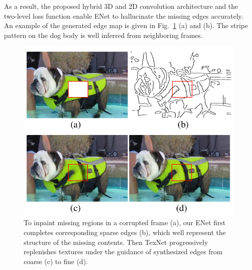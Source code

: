As a result, the proposed hybrid 3D and 2D convolution architecture and the two-level loss function enable ENet to hallucinate the missing edges accurately.
An example of the generated edge map is given in Fig.~\ref{fig:coarse-fine} (a) and (b). 
The stripe pattern on the dog body is well inferred from neighboring frames. 


\begin{figure}[t]
	\centering
	\includegraphics[width=0.8\columnwidth]{coars-fine} %
	\caption{To inpaint missing regions in a corrupted frame (a), our ENet first completes corresponding sparse edges (b), which well represent the structure of the missing contents. Then TexNet progressively replenishes textures under the guidance of synthesized edges from coarse (c) to fine (d).}
	
	\label{fig:coarse-fine}
\end{figure}




